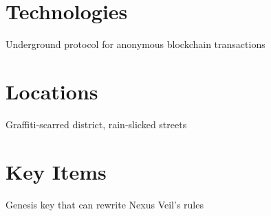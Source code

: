 \documentclass[12pt,oneside]{book}
\begin{document}
\section{Technologies}

\begin{description}[style=nextline]

\item[\textcolor{matrixgreen}{Nexus Veil}] \textcolor{neonblue}{Underground protocol for anonymous blockchain transactions}

\end{description}

\section{Locations}

\begin{description}[style=nextline]

\item[\textcolor{neonblue}{Berlin Kreuzberg}] \textcolor{matrixgreen}{Graffiti-scarred district, rain-slicked streets}

\end{description}

\section{Key Items}

\begin{description}[style=nextline]

\item[\textcolor{neongreen}{Master Node}] \textcolor{neonblue}{Genesis key that can rewrite Nexus Veil's rules}

\end{description}
\end{document}
